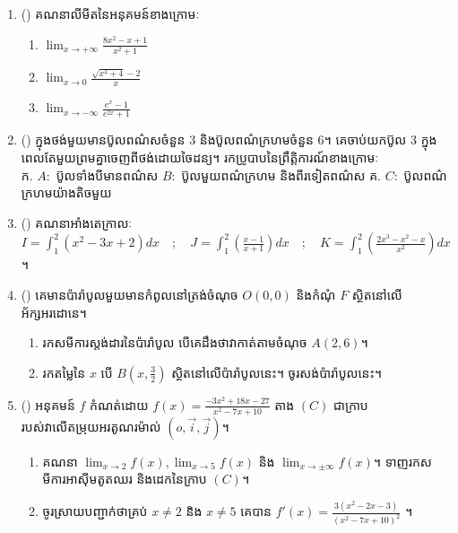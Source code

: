\documentclass{officialexam}
\begin{document}
\newpage
 {\maketitle}
\begin{center}
\end{center}
\begin{enumerate}[I]
	\item {\color{khtug}()} គណនាលីមីតនៃអនុគមន៍ខាងក្រោមៈ
	\begin{enumerate}[k,3]
		\item $\lim_{x\to +\infty}\frac{8x^2-x+1}{x^2+1}$
		\item $\lim_{x\to 0}\frac{\sqrt{x^2+4}-2}{x}$
		\item $\lim_{x \to -\infty }\frac{e^{x}-1}{e^{2x}+1}$
	\end{enumerate}
	\item {\color{khtug}()} ក្នុងថង់មួយមានប៊ូលពណ៌សចំនួន $3$ និងប៊ូលពណ៌ក្រហមចំនួន $6$។ គេចាប់យកប៊ូល $3$ ក្នុងពេលតែមួយព្រមគ្នាចេញពីថង់ដោយចៃដន្យ។ រកប្រូបាបនៃព្រឹត្តិការណ៍ខាងក្រោមៈ\\
	{\color{khtug}ក.} $A:$ ប៊ូលទាំងបីមានពណ៌ស $B:$ ប៊ូលមួយពណ៌ក្រហម និងពីរទៀតពណ៌ស\quad
	{\color{khtug}គ.} $C:$ ប៊ូលពណ៌ក្រហមយ៉ាងតិចមួយ
	\item {\color{khtug}()} គណនាអាំងតេក្រាលៈ
	$I=\int_{1}^{2}\left(x^{2}-3x+2\right)dx\quad;\quad J=\int_{1}^{2}\left(\frac{x-1}{x+1}\right)dx\quad;\quad K=\int_{1}^{2}\left(\frac{2x^3-x^2-x}{x^2}\right)dx$។
	\item {\color{khtug}()} គេមានប៉ារ៉ាបូលមួយមានកំពូលនៅត្រង់ចំណុច $O\left(0,0\right)$ និងកំណុំ $F$ ស្ថិតនៅលើអ័ក្សអរដោនេ។
	\begin{enumerate}[k]
		\item រកសមីការស្តង់ដារនៃប៉ារ៉ាបូល បើគេដឹងថាវាកាត់តាមចំណុច $A\left(2,6\right)$។
		\item រកតម្លៃនៃ $x$ បើ $B\left(x,\frac{3}{2}\right)$ ស្ថិតនៅលើប៉ារ៉ាបូលនេះ។ ចូរសង់ប៉ារ៉ាបូលនេះ។
	\end{enumerate}
	\item {\color{khtug}()} អនុគមន៍ $f$ កំណត់ដោយ $f(x)=\frac{-3x^2+18x-27}{x^2-7x+10}$ តាង $\left(C\right)$ ជាក្រាបរបស់វាលើតម្រុយអរតូណរម៉ាល់ $\left(o,\vec{i},\vec{j}\right)$។
	\begin{enumerate}[k]
		\item គណនា $\lim_{x\to 2}f(x),\lim_{x\to 5}f(x)$ និង $\lim_{x \to \pm\infty }f(x)$។ ទាញរកសមីការអាសុីមតូតឈរ និងដេកនៃក្រាប $\left(C\right)$។
		\item ចូរស្រាយបញ្ជាក់ថាគ្រប់ $x\ne2$ និង $x\ne5$ គេបាន $f'(x)=\frac{3\left(x^2-2x-3\right)}{\left(x^2-7x+10\right)^{2}}$ ។

\end{enumerate}
\end{enumerate}
\end{document}
